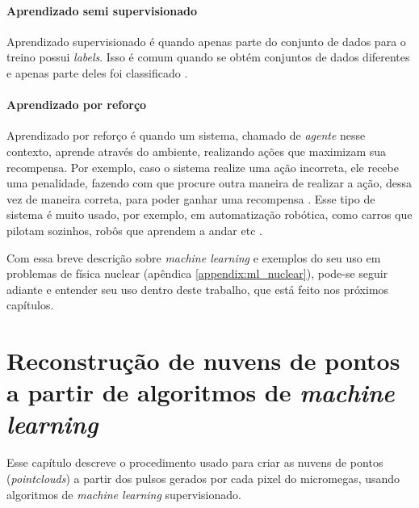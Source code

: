 \documentclass[a4paper,12pt,oneside]{book}
\begin{document}
\subsubsection*{Aprendizado semi supervisionado}

\par Aprendizado supervisionado é quando apenas parte do conjunto de dados para o treino possui \textit{labels}. Isso é comum quando se obtém conjuntos de dados diferentes e apenas parte deles foi classificado \cite{semi_supervised}.

\subsubsection*{Aprendizado por reforço}

\par Aprendizado por reforço é quando um sistema, chamado de \textit{agente} nesse contexto, aprende através do ambiente, realizando ações que maximizam sua recompensa. Por exemplo, caso o sistema realize uma ação incorreta, ele recebe uma penalidade, fazendo com que procure outra maneira de realizar a ação, dessa vez de maneira correta, para poder ganhar uma recompensa \cite{reinforcement}. Esse tipo de sistema é muito usado, por exemplo, em automatização robótica, como carros que pilotam sozinhos, robôs que aprendem a andar etc \cite{robot_ml}.



\par Com essa breve descrição sobre \textit{machine learning} e exemplos do seu uso em problemas de física nuclear (apêndica \ref{appendix:ml_nuclear}), pode-se seguir adiante e entender seu uso dentro deste trabalho, que está feito nos próximos capítulos.

\chapter{Reconstrução de nuvens de pontos a partir de algoritmos de \textit{machine learning}}\label{chapter:sinais}

\par Esse capítulo descreve o procedimento usado para criar as nuvens de pontos (\textit{pointclouds}) a partir dos pulsos gerados por cada pixel do micromegas, usando algoritmos de \textit{machine learning} supervisionado.
\end{document}
